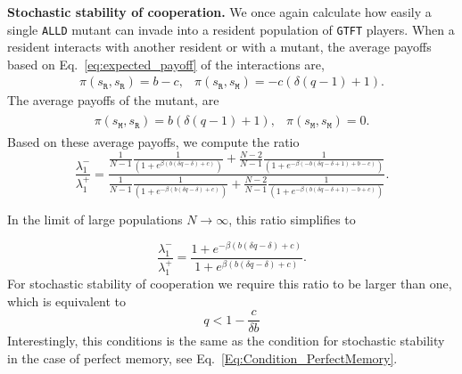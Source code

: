 \documentclass[11pt]{article}
\def\alld{\texttt{ALLD}}
\def\gtft{\texttt{GTFT}}
\def\resident{\texttt{R}}
\def\mutant{\texttt{M}}
\def\strategy{s}
\theoremstyle{plainCl1}
\theoremstyle{plainCl2}
\begin{document}
\noindent
{\bf Stochastic stability of cooperation.}
We once again calculate how easily a single \alld{} mutant can invade into a
resident population of \gtft{} players. When a resident interacts with another
resident or with a mutant,
the average payoffs based on Eq.~\eqref{eq:expected_payoff} of the interactions are,
\begin{equation*}
\begin{array}{ll}
  \pi (\strategy_\resident, \strategy_\resident) =  b - c,
  &\pi (\strategy_\resident, \strategy_\mutant) =  - c \left(\delta \left(q - 1\right) + 1\right).
\end{array}
\end{equation*}
The average payoffs of the mutant, are
\begin{align*}
\begin{array}{ll}
  \pi (\strategy_\mutant, \strategy_\resident) =  b \left(\delta \left(q - 1\right) + 1\right),
  &\pi (\strategy_\mutant, \strategy_\mutant) =  0.
\end{array}
\end{align*}
Based on these average payoffs, we compute the ratio
\begin{equation}
  \frac{\lambda^{-}_1}{\lambda^{+}_1} =
  \frac{\frac{1}{N-1}\frac{1}{\left(1 + e^{\beta \left(b \left(\delta q - \delta\right) + c\right)}\right)}
  + \frac{N - 2}{N-1}\frac{1}{\left(1 + e^{- \beta \left(- b \left(\delta q - \delta + 1\right) + b - c\right)}\right)}}
  {\frac{1}{N-1}\frac{1}{\left(1 + e^{- \beta \left(b \left(\delta q - \delta\right) + c\right)}\right)}
  + \frac{N - 2}{N-1}\frac{1}{\left(1 + e^{- \beta \left(b \left(\delta q - \delta + 1\right) - b + c\right)}\right)}}.
\end{equation}

\noindent
In the limit of large populations \(N \rightarrow \infty \), this ratio simplifies to

\begin{equation}
  \frac{\lambda^{-}_1}{\lambda^{+}_1} =
  \frac{1 + e^{- \beta \left(b \left(\delta q - \delta\right) + c\right)}}{1 + e^{\beta \left(b \left(\delta q - \delta\right) + c\right)}}.
\end{equation}
For stochastic stability of cooperation we require this ratio to be larger than one, which is equivalent to
\begin{equation} \label{Eq:Condition_OneInteractionExpectedPayoff}
  q<1 - \frac{c}{\delta b}
\end{equation}
Interestingly, this conditions is the same as the condition for stochastic
stability in the case of perfect memory, see
Eq.~\eqref{Eq:Condition_PerfectMemory}.
\end{document}
